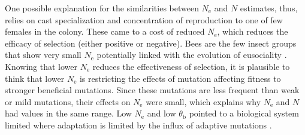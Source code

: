 \documentclass[a4paper, 12pt]{article}
\begin{document}

One possible explanation for the similarities between $N_\mathrm{e}$ and $N$ estimates, thus, relies on cast specialization and concentration of reproduction to one of few females in the colony. These came to a cost of reduced $N_{\mathrm{e}}$, which reduces the efficacy of selection (either positive or negative). Bees are the few insect groups that show very small $N_{\mathrm{e}}$ potentially linked with the evolution of eusociality \citep{Romiguier:2014dh}. Knowing that lower $N_{\mathrm{e}}$ reduces the effectiveness of selection, it is plausible to think that lower $N_\mathrm{e}$ is restricting the effects of mutation affecting fitness to stronger beneficial mutations. Since these mutations are less frequent than weak or mild mutations, their effects on $N_\mathrm{e}$ were small, which explains why $N_\mathrm{e}$ and $N$ had values in the same range. Low $N_\mathrm{e}$ and low $\theta_{\mathrm{b}}$ pointed to a biological system limited where adaptation is limited by the influx of adaptive mutations \citep{Rousselle:2020ct}.
\end{document}

